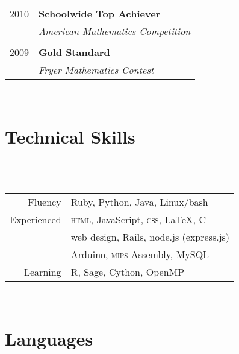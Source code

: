 \documentclass[10pt]{article} %
\begin{document}
{\begin{minipage}[t]{0.44\textwidth}
\begin{tabular}{rl}

2010	 & \textbf{Schoolwide Top Achiever}\\
& \textit{American Mathematics Competition}\\ \\


2009	 & \textbf{Gold Standard}\\
& \textit{Fryer Mathematics Contest}
\end{tabular}\\[10pt]


\section{Technical Skills} 
\\[10pt] \\[10pt]

\begin{tabular}{rl}
Fluency
& Ruby, Python, Java, Linux/bash \\
Experienced
& \textsc{html}, JavaScript, \textsc{css}, \LaTeX, C \\
& web design, Rails, node.js (express.js) \\
& Arduino, \textsc{mips} Assembly, MySQL \\
Learning
& R, Sage, Cython, OpenMP
\end{tabular}\\[10pt]


\section{Languages}
\\

\\[10pt]



\end{minipage}}
\end{document}
